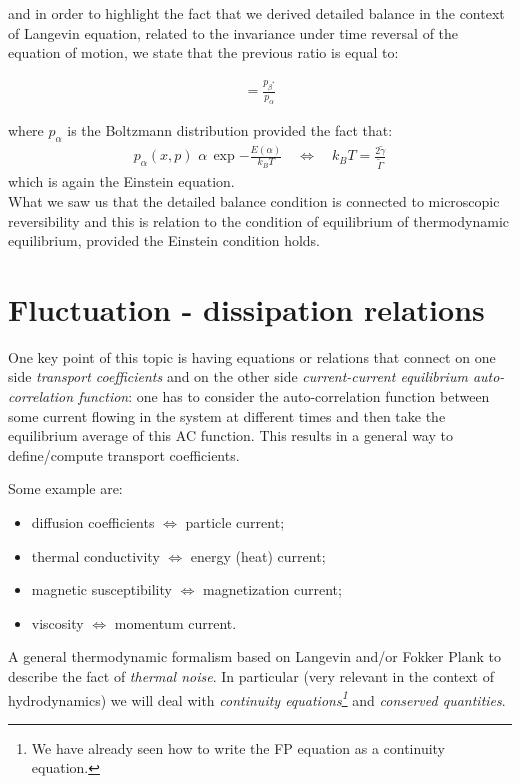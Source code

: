 \documentclass[\main/main.tex]{subfiles}
\begin{document}
and in order to highlight the fact that we derived detailed balance in the context of Langevin equation, related to the invariance under time reversal of the equation of motion, we state that the previous ratio is equal to:

\begin{align}
    = \frac{p_{\beta^*}}{p_{\alpha}}
\end{align}

where $p_{\alpha}$ is the Boltzmann distribution provided the fact that:
\begin{align}
    p_{\alpha}(x,p) \,\,\alpha\, \exp{-\frac{E(\alpha)}{k_B T}} \quad \iff \quad \boxed{k_B T = \frac{2\tilde{\gamma}}{\tilde{\Gamma}}}
\end{align}
which is again the Einstein equation. \\

What we saw us that the detailed balance condition is connected to microscopic reversibility and this is relation to the condition of equilibrium of thermodynamic equilibrium, provided the Einstein condition holds.

\section{Fluctuation - dissipation relations}
One key point of this topic is having equations or relations that connect on one side \textit{transport coefficients} and on the other side \textit{current-current equilibrium auto-correlation function}: one has to consider the auto-correlation function between some current flowing in the system at different times and then take the equilibrium average of this AC function. This results in a general way to define/compute transport coefficients.

Some example are:
\begin{itemize}
    \item diffusion coefficients $\Longleftrightarrow$ particle current;
    \item thermal conductivity $\Longleftrightarrow$ energy (heat) current;
    \item magnetic susceptibility $\Longleftrightarrow$ magnetization current;
    \item viscosity $\Longleftrightarrow$ momentum current.
\end{itemize}

A general thermodynamic formalism based on Langevin and/or Fokker Plank to describe the fact of \textit{thermal noise}. In particular (very relevant in the context of hydrodynamics) we will deal with \textit{continuity equations\footnote{We have already seen how to write the FP equation as a continuity equation.}} and \textit{conserved quantities}. \\
\end{document}
